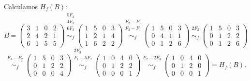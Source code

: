 \documentclass[a4paper,12pt]{article}
\begin{document}
\begin{ejercicio}[title=Ejercicio 11]
Calculamos $H_f(B)$:
\[
B =
\begin{pmatrix}
3 & 1 & 0 & 2\\
2 & 4 & 2 & 1\\
6 & 1 & 5 & 5
\end{pmatrix}
\overset{\substack{5F_1 \\ 4F_2 \\ 6F_3 \\ {}}}{\sim_f}
\begin{pmatrix}
1 & 5 & 0 & 3\\
1 & 2 & 1 & 4\\
1 & 6 & 2 & 2
\end{pmatrix}
\overset{\substack{F_2-F_1 \\ F_3-F_1 \\ {}}}{\sim_f}
\begin{pmatrix}
1 & 5 & 0 & 3\\
0 & 4 & 1 & 1\\
0 & 1 & 2 & 6
\end{pmatrix}
\overset{\substack{2F_2 \\ {}}}{\sim_f}
\begin{pmatrix}
1 & 5 & 0 & 3\\
0 & 1 & 2 & 2\\
0 & 1 & 2 & 6
\end{pmatrix}
\]
\[
\overset{\substack{F_3 - F_2 \\ {}}}{\sim_f}
\begin{pmatrix}
1 & 5 & 0 & 3\\
0 & 1 & 2 & 2\\
0 & 0 & 0 & 4
\end{pmatrix}
\overset{\substack{2F_3 \\ F_1 - 5F_2 \\ {}}}{\sim_f}
\begin{pmatrix}
1 & 0 & 4 & 0\\
0 & 1 & 2 & 2\\
0 & 0 & 0 & 1
\end{pmatrix}
\overset{\substack{F_2 - 2F_3 \\ {}}}{\sim_f}
\begin{pmatrix}
1 & 0 & 4 & 0\\
0 & 1 & 2 & 0\\
0 & 0 & 0 & 1
\end{pmatrix}
= H_f(B).
\]

\vspace{0.5em}


\end{ejercicio}
\end{document}
